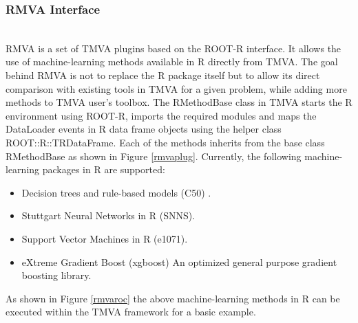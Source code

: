 \documentclass[a4paper]{jpconf}
\begin{document}
\subsubsection{RMVA Interface}\label{RMVA}\hspace*{\fill} \\
RMVA is a set of TMVA plugins based on the ROOT-R interface. It allows the use of machine-learning methods available in R directly from TMVA. The goal behind RMVA is not to replace the R package itself but to allow its direct comparison with existing tools in TMVA for a given problem, while adding more methods to TMVA user’s toolbox.\newline
The RMethodBase class in TMVA starts the R environment using ROOT-R, imports the required modules and maps the DataLoader events in R data frame objects using the helper class ROOT::R::TRDataFrame.
Each of the methods inherits from the base class RMethodBase as shown in Figure \ref{rmvaplug}. 
Currently, the following machine-learning packages in R are supported: 
\begin{itemize}  
\item Decision trees and rule-based models (C50) \cite{c50}.
\item Stuttgart Neural Networks in R (SNNS)\cite{rsnns}.
\item Support Vector Machines in R (e1071)\cite{e1071}.
\item eXtreme Gradient Boost (xgboost) An optimized general purpose gradient boosting library\cite{chen2015xgboost}.
\end{itemize}
As shown in Figure \ref{rmvaroc} the above machine-learning methods in R can be executed within the TMVA framework for a basic example.
\end{document}
